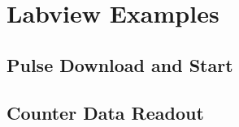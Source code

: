\section{Labview Examples}
\subsection{Pulse Download and Start}
\subsection{Counter Data Readout}







%
%
%
%
